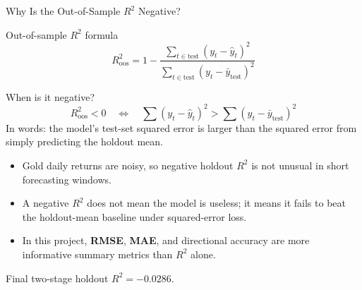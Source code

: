 \begin{frame}{Why Is the Out-of-Sample \texorpdfstring{$R^2$}{R2} Negative?}
  \begin{block}{Out-of-sample \texorpdfstring{$R^2$}{R2} formula}
    \[
    R^2_{\mathrm{oos}}
    =
    1-
    \frac{\sum_{t \in \mathrm{test}} (y_t-\hat{y}_t)^2}
         {\sum_{t \in \mathrm{test}} (y_t-\bar{y}_{\mathrm{test}})^2}
    \]
  \end{block}

  \begin{alertblock}{When is it negative?}
    \[
    R^2_{\mathrm{oos}} < 0
    \quad \Longleftrightarrow \quad
    \sum (y_t-\hat{y}_t)^2
    >
    \sum (y_t-\bar{y}_{\mathrm{test}})^2
    \]
    In words: the model's test-set squared error is larger than the squared error from simply predicting the holdout mean.
  \end{alertblock}

  \begin{itemize}
    \item Gold daily returns are noisy, so negative holdout $R^2$ is not unusual in short forecasting windows.
    \item A negative $R^2$ does \alert{not} mean the model is useless; it means it fails to beat the holdout-mean baseline under squared-error loss.
    \item In this project, \textbf{RMSE}, \textbf{MAE}, and directional accuracy are more informative summary metrics than $R^2$ alone.
  \end{itemize}

  \tiny
  Final two-stage holdout $R^2 = -0.0286$.
\end{frame}
